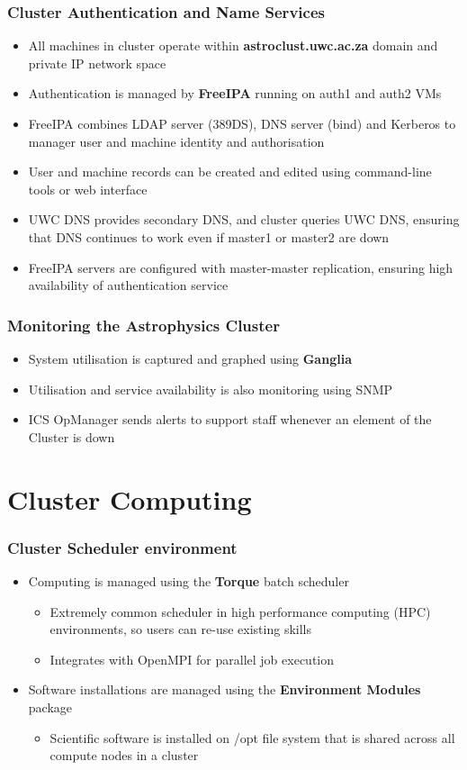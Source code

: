 \documentclass[handout]{beamer}
\begin{document}
\begin{frame}
\frametitle{Cluster Authentication and Name Services}
\begin{itemize}
\item All machines in cluster operate within \textbf{astroclust.uwc.ac.za} domain and private IP network space
\item Authentication is managed by \textbf{FreeIPA} running on auth1 and auth2 VMs
\item FreeIPA combines LDAP server (389DS), DNS server (bind) and Kerberos to manager user and machine identity and authorisation
\item User and machine records can be created and edited using command-line tools or web interface
\item UWC DNS provides secondary DNS, and cluster queries UWC DNS, ensuring that DNS continues to work even if master1 or master2 are down
\item FreeIPA servers are configured with master-master replication, ensuring high availability of authentication service
\end{itemize}
\end{frame}

\begin{frame}
\frametitle{Monitoring the Astrophysics Cluster}
\begin{itemize}
\item System utilisation is captured and graphed using \textbf{Ganglia}
\item Utilisation and service availability is also monitoring using SNMP
\item ICS OpManager sends alerts to support staff whenever an element of the Cluster is down
\end{itemize}
\end{frame}

\section{Cluster Computing}

\begin{frame}
\frametitle{Cluster Scheduler environment}
\begin{itemize}
\item Computing is managed using the \textbf{Torque} batch scheduler
\begin{itemize}
\item Extremely common scheduler in high performance computing (HPC) environments, so users can re-use existing skills
\item Integrates with OpenMPI for parallel job execution
\end{itemize}
\item Software installations are managed using the \textbf{Environment Modules} package
\begin{itemize}
\item Scientific software is installed on /opt file system that is shared across all compute nodes in a cluster
\end{itemize}

\end{itemize}
\end{frame}
\end{document}

